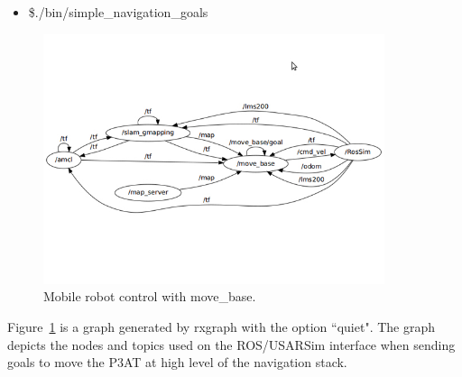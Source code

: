 \begin{itemize}
\item[]\$./bin/simple\_navigation\_goals
\end{itemize}

\begin{figure}[t!]
\centering
\includegraphics[width=10cm]{Figures/Misc/move_base.jpg}
\caption{Mobile robot control with move\_base.}\label{fig:movebase}
\end{figure}
Figure~\ref{fig:movebase} is a graph generated by rxgraph with the option ``quiet". The graph depicts the nodes and topics used on the ROS/USARSim interface when sending goals to move the P3AT at high level of the navigation stack.

